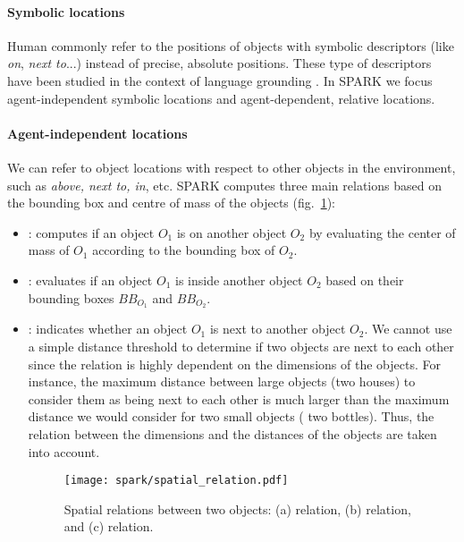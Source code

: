 \paragraph{Symbolic locations}

Human commonly refer to the positions of objects with symbolic descriptors
(like \emph{on}, \emph{next to}...) instead of precise, absolute positions.
These type of descriptors have been studied in the context of language
grounding \cite{O'Keefe1999,Matuszek2010,Regier2001,Kelleher2006,Blisard2005}.
In SPARK we focus agent-independent symbolic locations and agent-dependent,
relative locations.

\paragraph{Agent-independent locations}

We can refer to object locations with respect to other objects in the
environment, such as \emph{above, next to, in}, etc. SPARK computes
three main relations based on the bounding box and centre of mass of the
objects (fig.~\ref{fig|sprelations}): 

\begin{itemize}
	\item {}: computes if an object $O_1$ is on another object $O_2$ by
	evaluating the center of mass of $O_1$ according to the bounding box of $O_2$.

	\item {}: evaluates if an object $O_1$ is inside another object
	$O_2$ based on their bounding boxes $BB_{O_1}$ and $BB_{O_2}$.

	\item {}: indicates whether an object $O_1$ is next to another
	object $O_2$. We cannot use a simple distance threshold to determine if two
	objects are next to each other since the relation is highly dependent on the
	dimensions of the objects. For instance, the maximum distance between large
	objects (\eg two houses) to consider them as being next to each other is much
	larger than the maximum distance we would consider for two small objects (\eg
	two bottles). Thus, the relation between the dimensions and the distances of
	the objects are taken into account.  

\begin{figure} 
	\centering
	\texttt{[image: spark/spatial\_relation.pdf]}
	\caption{Spatial relations between two objects: (a)  relation, 
	(b)  relation, and (c)  relation.} 
	\label{fig|sprelations} 
\end{figure}

\end{itemize} 

